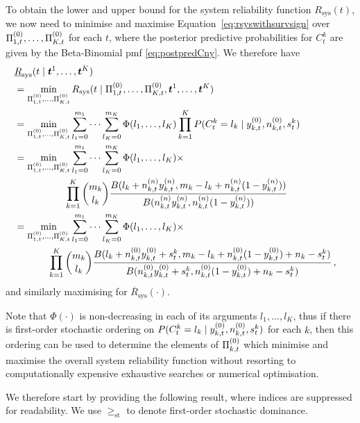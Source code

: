 \documentclass[12pt, a4paper]{elsarticle}
\newcommand{\bs}[1]{\boldsymbol{#1}}
\renewcommand{\vec}[1]{{\bs#1}}
\newcommand{\ul}[1]{\underline{#1}}
\newcommand{\ol}[1]{\overline{#1}}
\newcommand{\Rsys}{R_\text{sys}}
\newcommand{\lRsys}{\ul{R}_\text{sys}}
\newcommand{\uRsys}{\ol{R}_\text{sys}}
\begin{document}
To obtain the lower and upper bound for the system reliability function $\Rsys(t)$,
we now need to minimise and maximise Equation~\eqref{eq:rsyswithsurvsign} over $\Pi^{(0)}_{1,t}, \ldots, \Pi^{(0)}_{K,t}$ for each $t$,
where the posterior predictive probabilities for $C^k_t$ are given by the Beta-Binomial pmf \eqref{eq:postpredCny}.
We therefore have
\begin{align}
\lefteqn{\lRsys(t \mid \vec{t}^1, \ldots, \vec{t}^K)} \nonumber \\
 &= \min_{\PtZi{1}, \ldots, \PtZi{K}} \Rsys(t \mid \PtZi{1}, \ldots, \PtZi{K}, \vec{t}^1, \ldots, \vec{t}^K) \nonumber \\
 &= \min_{\PtZi{1}, \ldots, \PtZi{K}} 
    \sum_{l_1=0}^{m_1} \cdots \sum_{l_K=0}^{m_K} \Phi(l_1, \ldots, l_K)
                                                 \prod_{k=1}^K P(C^k_t = l_k \mid \yktz, \nktz, s^k_t) \nonumber \\
 &= \min_{\PtZi{1}, \ldots, \PtZi{K}} 
    \sum_{l_1=0}^{m_1} \cdots \sum_{l_K=0}^{m_K} \Phi(l_1, \ldots, l_K) \times \nonumber \\ & \hspace*{12ex}
    \prod_{k=1}^K {m_k \choose l_k} \frac{B(l_k + \nn_{k,t}\yn_{k,t}, m_k - l_k + \nn_{k,t}(1-\yn_{k,t}))}
                                         {B(\nn_{k,t}\yn_{k,t}, \nn_{k,t}(1-\yn_{k,t}))} \nonumber \\
 &= \min_{\PtZi{1}, \ldots, \PtZi{K}} 
    \sum_{l_1=0}^{m_1} \cdots \sum_{l_K=0}^{m_K} \Phi(l_1, \ldots, l_K) \times \nonumber \\ & \hspace*{8ex}
    \prod_{k=1}^K {m_k \choose l_k} \frac{B(l_k + \nktz\yktz + s^k_t, m_k - l_k + \nktz(1-\yktz) + n_k - s^k_t)}{B(\nktz\yktz + s^k_t, \nktz(1-\yktz) + n_k - s^k_t)}
    \,, \label{eq:LwrSysPostA}
\end{align}
and similarly maximising for $\uRsys(\cdot)$.

Note that $\Phi(\cdot)$ is non-decreasing in each of its arguments $l_1,\ldots,l_K$,
thus if there is first-order stochastic ordering on $P(C^k_t = l_k \mid y^{(0)}_{k,t}, n^{(0)}_{k,t}, s^k_t)$
for each $k$, then this ordering can be used to determine the elements of $\Pi^{(0)}_{k,t}$
which minimise and maximise the overall system reliability function without
resorting to computationally expensive exhaustive searches or numerical optimisation.

We therefore start by providing the following result, where indices are suppressed for readability.
We use $\ge_{\mathrm{st}}$ to denote first-order stochastic dominance.
\end{document}
